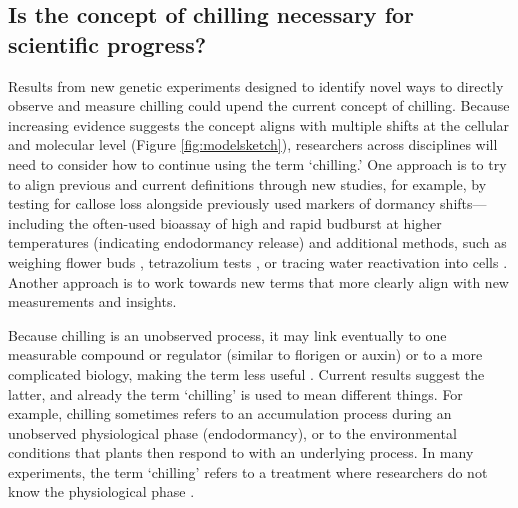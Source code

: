 \documentclass[11pt]{article}
\newcommand{\R}[1]{\label{#1}\linelabel{#1}}
\begin{document}
\subsection*{Is the concept of chilling necessary for scientific progress?}  

Results from new genetic\R{babadmol} experiments designed to identify novel ways to directly observe and measure chilling could upend the current concept of chilling. Because increasing evidence suggests the concept aligns with multiple shifts at the cellular and molecular level (Figure \ref{fig:modelsketch}), researchers across disciplines will need to consider how to continue using the term `chilling.' One approach is to try to align previous and current definitions through new studies,  %
for example, by testing for callose loss \citep{yu2024building} alongside previously used markers of dormancy shifts---including the often-used bioassay of high and rapid budburst at higher temperatures (indicating endodormancy release) and additional methods, such as weighing flower buds \citep{chuine2016}, tetrazolium tests \citep{bonhomme2000influence,carvalho2007metabolic}, or tracing water reactivation into cells \citep{faust1991bound,Kalcsits2009,walde2024stable}. %
Another approach is to work towards new terms that more clearly align with new measurements and insights. 

Because chilling is an unobserved process, it may link eventually to one measurable compound or regulator (similar to florigen or auxin) or to a more complicated biology, making the term less useful \citep{aksenova2006florigen}. Current results suggest the latter, and already the term `chilling' is used to mean different things. \R{r1huhS}For example, chilling sometimes refers to an accumulation process during an unobserved physiological phase (endodormancy), or to the environmental conditions that plants then respond to with an underlying process. In many experiments, the term `chilling' refers to a treatment where researchers do not know the physiological phase \citep[for example, cuttings or buds from woody plants are often chilled at 5\degree C for 6 weeks in the dark in a `chilling' treatment, then transferred to warm `forcing' conditions, without any tests that could confirm the phase, such as recording percent budburst at high temperatures, or tracking cellular processes,][]{flynn2018,ospreebbms}.\R{r1huhE}
\end{document}
